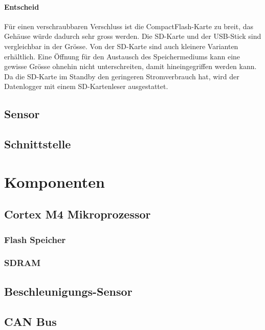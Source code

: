 

\paragraph{Entscheid} Für einen verschraubbaren Verschluss ist die CompactFlash-Karte zu breit, das Gehäuse würde dadurch sehr gross werden. Die SD-Karte und der USB-Stick sind vergleichbar in der Grösse. Von der SD-Karte sind auch kleinere Varianten erhältlich. Eine Öffnung für den Austausch des Speichermediums kann eine gewisse Grösse ohnehin nicht unterschreiten, damit hineingegriffen werden kann. Da die SD-Karte im Standby den geringeren Stromverbrauch hat, wird der Datenlogger mit einem SD-Kartenleser ausgestattet.

\subsection{Sensor}


\subsection{Schnittstelle}




\section{Komponenten}

\subsection{Cortex M4 Mikroprozessor}

\subsubsection{Flash Speicher}

\subsubsection{SDRAM}


\subsection{Beschleunigungs-Sensor}

\subsection{CAN Bus}

